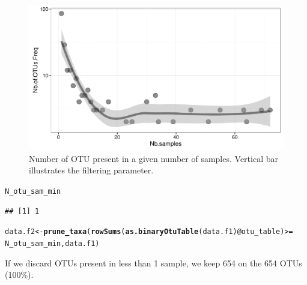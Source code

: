 \documentclass[12pt]{article}\usepackage[]{graphicx}\usepackage[]{color}
\makeatletter
\def\maxwidth{ %
  \ifdim\Gin@nat@width>\linewidth
    \linewidth
  \else
    \Gin@nat@width
  \fi
}
\newcommand{\hlopt}[1]{\textcolor[rgb]{0,0,0}{#1}}%
\newcommand{\hlstd}[1]{\textcolor[rgb]{0.345,0.345,0.345}{#1}}%
\newcommand{\hlkwb}[1]{\textcolor[rgb]{0.69,0.353,0.396}{#1}}%
\newcommand{\hlkwc}[1]{\textcolor[rgb]{0.333,0.667,0.333}{#1}}%
\newcommand{\hlkwd}[1]{\textcolor[rgb]{0.737,0.353,0.396}{\textbf{#1}}}%
\newenvironment{kframe}{%
 \def\at@end@of@kframe{}%
 \ifinner\ifhmode%
  \def\at@end@of@kframe{\end{minipage}}%
  \begin{minipage}{\columnwidth}%
 \fi\fi%
 \def\FrameCommand##1{\hskip\@totalleftmargin \hskip-\fboxsep
 \colorbox{shadecolor}{##1}\hskip-\fboxsep
     \hskip-\linewidth \hskip-\@totalleftmargin \hskip\columnwidth}%
 \MakeFramed {\advance\hsize-\width
   \@totalleftmargin\z@ \linewidth\hsize
   \@setminipage}}%
 {\par\unskip\endMakeFramed%
 \at@end@of@kframe}
\newenvironment{knitrout}{}{} %
\numberwithin{figure}{section}
\makeatother
\begin{document}
\begin{knitrout}
\begin{figure}
{\centering \includegraphics[width=\maxwidth]{figure/nbOtu_sample-1} 

}

\caption[Number of OTU present in a given number of samples]{Number of OTU present in a given number of samples. Vertical bar illustrates the filtering parameter.}\label{fig:nbOtu_sample}
\end{figure}


\end{knitrout}

\begin{knitrout}\small
{}\color{fgcolor}\begin{kframe}
\begin{alltt}
\hlstd{N_otu_sam_min}
\end{alltt}
\begin{verbatim}
## [1] 1
\end{verbatim}
\end{kframe}
\end{knitrout}

\begin{knitrout}\small
{}\color{fgcolor}\begin{kframe}
\begin{alltt}
\hlstd{data.f2} \hlkwb{<-} \hlkwd{prune_taxa}\hlstd{(}\hlkwd{rowSums}\hlstd{(}\hlkwd{as.binaryOtuTable}\hlstd{(data.f1)}\hlopt{@}\hlkwc{otu_table}\hlstd{)} \hlopt{>=}
                        \hlstd{N_otu_sam_min, data.f1)}
\end{alltt}
\end{kframe}
\end{knitrout}

If we discard OTUs present in less than 1 sample, we keep 654 on the 654 OTUs (100\%).
\end{document}
